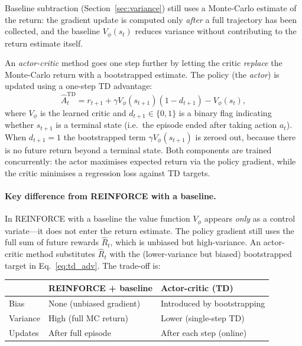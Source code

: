 \documentclass[12pt, a4paper]{article}
\theoremstyle{definition}
\theoremstyle{plain}
\theoremstyle{remark}
\begin{document}
Baseline subtraction (Section~\ref{sec:variance}) still uses a Monte-Carlo estimate
of the return: the gradient update is computed only \emph{after} a full trajectory
has been collected, and the baseline $V_\phi(s_t)$ reduces variance without
contributing to the return estimate itself.

An \emph{actor-critic} method goes one step further by letting the critic
\emph{replace} the Monte-Carlo return with a bootstrapped estimate.  The policy
(the \emph{actor}) is updated using a one-step TD advantage:
\begin{equation}
  \hat{A}_t^{\mathrm{TD}} = r_{t+1} + \gamma V_\phi(s_{t+1})(1 - d_{t+1}) - V_\phi(s_t),
  \label{eq:td_adv}
\end{equation}
where $V_\phi$ is the learned critic and $d_{t+1} \in \{0, 1\}$ is a binary flag
indicating whether $s_{t+1}$ is a terminal state (i.e.\ the episode ended after
taking action $a_t$).  When $d_{t+1} = 1$ the bootstrapped term
$\gamma V_\phi(s_{t+1})$ is zeroed out, because there is no future return beyond
a terminal state.  Both components are trained concurrently:
the actor maximises expected return via the policy gradient, while the critic
minimises a regression loss against TD targets.

\paragraph{Key difference from REINFORCE with a baseline.}
In REINFORCE with a baseline the value function $V_\phi$ appears \emph{only} as a
control variate---it does not enter the return estimate.  The policy gradient still
uses the full sum of future rewards $\hat{R}_t$, which is unbiased but high-variance.
An actor-critic method substitutes $\hat{R}_t$ with the (lower-variance but biased)
bootstrapped target in Eq.~\eqref{eq:td_adv}.  The trade-off is:
\begin{center}
\begin{tabular}{lll}
  \toprule
  & \textbf{REINFORCE + baseline} & \textbf{Actor-critic (TD)} \\
  \midrule
  Bias    & None (unbiased gradient)  & Introduced by bootstrapping \\
  Variance & High (full MC return)    & Lower (single-step TD)      \\
  Updates & After full episode        & After each step (online)    \\
  \bottomrule
\end{tabular}
\end{center}
\end{document}
